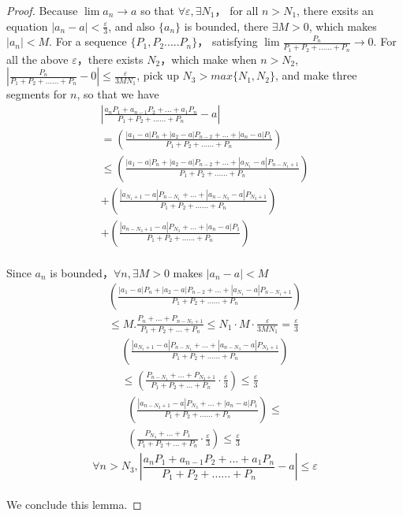 \documentclass[10pt,journal,letterpaper,compsoc]{IEEEtran}
\begin{document}
\begin{CJK}{UTF8}{gkai}
\begin{proof}
Because $\lim a_n \rightarrow a$
so that $\forall \varepsilon,\exists N_1$，
for all $n>N_1$, there exsits an equation 
$|a_n-a|<\frac{\varepsilon}{3}$,
and also $\{a_n\}$ is bounded, there $\exists M>0$, which makes $|a_n|<M$.
For a sequence $\{P_1,P_2.....P_n\}$，
satisfying $\lim \frac{P_n}{P_1+P_2+......+P_n} \rightarrow 0$.
For all the above $\varepsilon$，there exists $N_2$，which make when $n>N_2$,
$|\frac{P_n}{P_1+P_2+......+P_n}-0| \leq \frac{\varepsilon}{3MN_1}$,
pick up $N_3>max\{N_1,N_2\}$,
and make three segments for $n$, so that we have 
\begin{eqnarray*}
| \frac{a_n P_1+a_{n-1} P_2+...+a_1 P_n}{P_1+P_2+......+P_n}-a| \\
=( \frac{|a_1-a| P_n+|a_2-a| P_{n-2}+...+|a_n-a| P_1}{P_1+P_2+......+P_n})\\
\leq ( \frac{|a_1-a| P_n+|a_2-a| P_{n-2}+...+|a_{N_1}-a| P_{n-N_1+1}}{P_1+P_2+......+P_n})\\
+ ( \frac{|a_{N_1+1}-a| P_{n-N_1}+...+|a_{n-N_3}-a|  P_{N_3+1}}{P_1+P_2+......+P_n})\\
+ ( \frac{|a_{n-N_3+1}-a|  P_{N_3}+...+|a_{n}-a| P_1}{P_1+P_2+......+P_n})       
\end{eqnarray*}
\\Since ${a_n}$ is bounded，$\forall n,\exists M>0$
makes $|a_n-a|<M$
\begin{eqnarray*}
( \frac{|a_1-a| P_n+|a_2-a| P_{n-2}+...+|a_{N_1}-a| P_{n-N_1+1}}{P_1+P_2+......+P_n})\\
\leq M.\frac{P_n+...+P_{n-N_1+1}}{P_1+P_2+...+P_n} \leq N_1 \cdot M \cdot \frac{\varepsilon}{3MN_1}
=\frac{\varepsilon}{3}
\end{eqnarray*}
\begin{eqnarray*}
( \frac{|a_{N_1+1}-a| P_{n-N_1}+...+|a_{n-N_3}-a|  P_{N_3+1}}{P_1+P_2+......+P_n})\\
    \leq(\frac{P_{n-N_1}+...+P_{N_3+1}}{P_1+P_2+...+P_n}
\cdot \frac{\varepsilon}{3})
    \leq \frac{\varepsilon}{3}
\end{eqnarray*}
\begin{eqnarray*}
( \frac{|a_{n-N_3+1}-a|  P_{N_3}+...+|a_{n}-a| P_1}{P_1+P_2+......+P_n}) \leq \\
(\frac{P_{N_3}+...+P_1}{P_1+P_2+...+P_n} \cdot \frac{\varepsilon}{3}) \leq \frac{\varepsilon}{3}
\end{eqnarray*}
\begin{equation}  
 \forall n>N_3, | \frac{a_n P_1+a_{n-1} P_2+...+a_1 P_n}{P_1+P_2+......+P_n}-a|\leq \varepsilon 
\end{equation}
\\We conclude this lemma. 
\end{proof}


\end{CJK}
\end{document}
